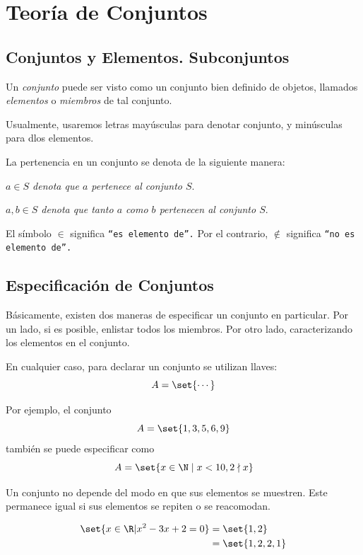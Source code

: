 \section{Teoría de Conjuntos}

\subsection{Conjuntos y Elementos. Subconjuntos}


	Un \emph{conjunto} puede ser visto como un conjunto bien definido de objetos, llamados \emph{elementos} o \emph{miembros} de tal conjunto. 
	
	Usualmente, usaremos letras mayúsculas para denotar conjunto, y minúsculas para dlos elementos. 



	La pertenencia en un conjunto se denota de la siguiente manera:
	\begin{center}
		\emph{$a \in S$ denota que $a$ pertenece al conjunto $S.$} 
		
		\emph{$a,b \in S$ denota que tanto $a$ como $b$ pertenecen al conjunto $S.$}
	\end{center}
	
	El símbolo $\in$ significa \texttt{``es elemento de''.}  Por el contrario, $\notin$ significa \texttt{``no es elemento de''.}


\subsection{Especificación de Conjuntos}


	Básicamente, existen dos maneras de especificar un conjunto en particular.  Por un lado, si es posible, enlistar todos los miembros.  Por otro lado, caracterizando los elementos en el conjunto.



	En cualquier caso, para declarar un conjunto se utilizan llaves:
	$$
	A=\set{\cdots}
	$$



	Por ejemplo, el conjunto 
	$$
	A=\set{1,3,5,6,9}
	$$
	tambi\'en se puede especificar como
	$$
	A=\set{x\in \N \mid x<10, 2\nmid x }
	$$



	Un conjunto no depende del modo en que sus elementos se muestren.  Este permanece igual si sus elementos se repiten o se reacomodan.




	\begin{problema}
		\begin{align}
			\set{x\in\R | x^{2}-3x+2=0} & =\set{1,2} \\
			&=\set{1,2,2,1}
		\end{align}
		
	\end{problema}
	


